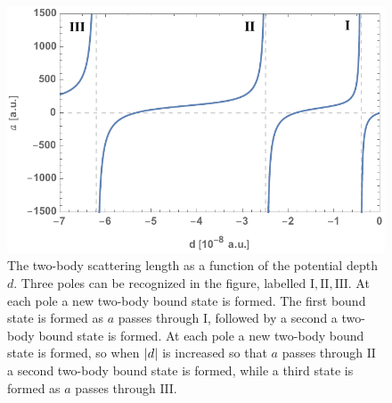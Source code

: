 \begin{figure}[b!]
	\includegraphics[width=\linewidth]{scatteringlength.pdf}
	\caption{The two-body scattering length as a function of the potential depth $d$. Three poles can be recognized in the figure, labelled $\mathrm{I},\mathrm{II},\mathrm{III}$. At each pole a new two-body bound state is formed. The first bound state is formed as $a$ passes through $\mathrm{I}$, followed by a second a two-body bound state is formed. At each pole a new two-body bound state is formed, so when $\lvert d\rvert$ is increased so that $a$ passes through $\mathrm{II}$ a second two-body bound state is formed, while a third state is formed as $a$ passes through $\mathrm{III}$.}
	\label{fig:res_1}
\end{figure}